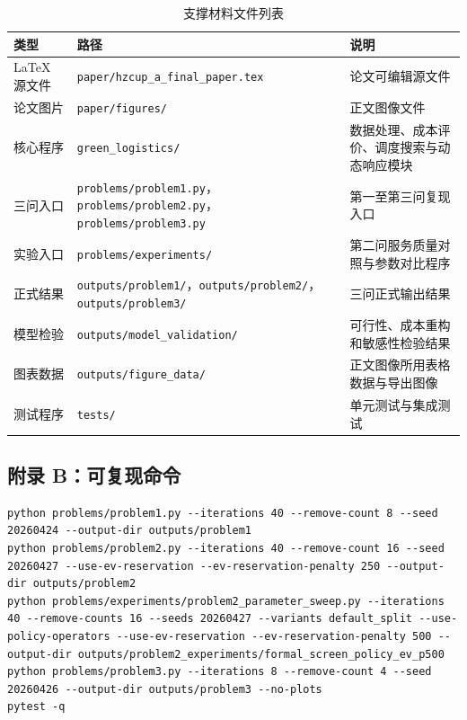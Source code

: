 \documentclass[UTF8,zihao=-4,a4paper]{ctexart}
\begin{document}
\begin{table}[H]
\centering
\small
\caption{支撑材料文件列表}
\label{tab:support-files}
\begin{tabularx}{\textwidth}{>{\raggedright\arraybackslash}X>{\raggedright\arraybackslash}X>{\raggedright\arraybackslash}X}
\toprule
类型 & 路径 & 说明 \\
\midrule
LaTeX 源文件 & \texttt{paper/hzcup\_a\_final\_paper.tex} & 论文可编辑源文件 \\
论文图片 & \texttt{paper/figures/} & 正文图像文件 \\
核心程序 & \texttt{green\_logistics/} & 数据处理、成本评价、调度搜索与动态响应模块 \\
三问入口 & \texttt{problems/problem1.py}，\texttt{problems/problem2.py}，\texttt{problems/problem3.py} & 第一至第三问复现入口 \\
实验入口 & \texttt{problems/experiments/} & 第二问服务质量对照与参数对比程序 \\
正式结果 & \texttt{outputs/problem1/}，\texttt{outputs/problem2/}，\texttt{outputs/problem3/} & 三问正式输出结果 \\
模型检验 & \texttt{outputs/model\_validation/} & 可行性、成本重构和敏感性检验结果 \\
图表数据 & \texttt{outputs/figure\_data/} & 正文图像所用表格数据与导出图像 \\
测试程序 & \texttt{tests/} & 单元测试与集成测试 \\
\bottomrule
\end{tabularx}
\end{table}

\subsection{附录 B：可复现命令}

\begin{lstlisting}[basicstyle=\ttfamily\footnotesize,breaklines=true]
python problems/problem1.py --iterations 40 --remove-count 8 --seed 20260424 --output-dir outputs/problem1
python problems/problem2.py --iterations 40 --remove-count 16 --seed 20260427 --use-ev-reservation --ev-reservation-penalty 250 --output-dir outputs/problem2
python problems/experiments/problem2_parameter_sweep.py --iterations 40 --remove-counts 16 --seeds 20260427 --variants default_split --use-policy-operators --use-ev-reservation --ev-reservation-penalty 500 --output-dir outputs/problem2_experiments/formal_screen_policy_ev_p500
python problems/problem3.py --iterations 8 --remove-count 4 --seed 20260426 --output-dir outputs/problem3 --no-plots
pytest -q
\end{lstlisting}
\end{document}
